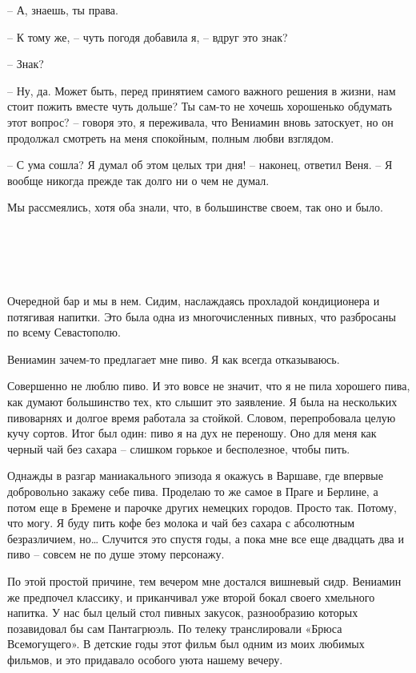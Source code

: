 \documentclass[
]{book}
\begin{document}
-- А, знаешь, ты права.

-- К тому же, -- чуть погодя добавила я, -- вдруг это знак?

-- Знак?

-- Ну, да. Может быть, перед принятием самого важного решения в жизни, нам стоит пожить вместе чуть дольше? Ты сам-то не хочешь хорошенько обдумать этот вопрос? -- говоря это, я переживала, что Вениамин вновь затоскует, но он продолжал смотреть на меня спокойным, полным любви взглядом.

-- С ума сошла? Я думал об этом целых три дня! -- наконец, ответил Веня. -- Я вообще никогда прежде так долго ни о чем не думал.

Мы рассмеялись, хотя оба знали, что, в большинстве своем, так оно и было.

\hypertarget{chapter-15}{%
\chapter{~}\label{chapter-15}}

Очередной бар и мы в нем. Сидим, наслаждаясь прохладой кондиционера и потягивая напитки. Это была одна из многочисленных пивных, что разбросаны по всему Севастополю.

Вениамин зачем-то предлагает мне пиво. Я как всегда отказываюсь.

Совершенно не люблю пиво. И это вовсе не значит, что я не пила хорошего пива, как думают большинство тех, кто слышит это заявление. Я была на нескольких пивоварнях и долгое время работала за стойкой. Словом, перепробовала целую кучу сортов. Итог был один: пиво я на дух не переношу. Оно для меня как черный чай без сахара -- слишком горькое и бесполезное, чтобы пить.

Однажды в разгар маниакального эпизода я окажусь в Варшаве, где впервые добровольно закажу себе пива. Проделаю то же самое в Праге и Берлине, а потом еще в Бремене и парочке других немецких городов. Просто так. Потому, что могу. Я буду пить кофе без молока и чай без сахара с абсолютным безразличием, но\ldots{} Случится это спустя годы, а пока мне все еще двадцать два и пиво -- совсем не по душе этому персонажу.

По этой простой причине, тем вечером мне достался вишневый сидр. Вениамин же предпочел классику, и приканчивал уже второй бокал своего хмельного напитка. У нас был целый стол пивных закусок, разнообразию которых позавидовал бы сам Пантагрюэль. По телеку транслировали «Брюса Всемогущего». В детские годы этот фильм был одним из моих любимых фильмов, и это придавало особого уюта нашему вечеру.
\end{document}
